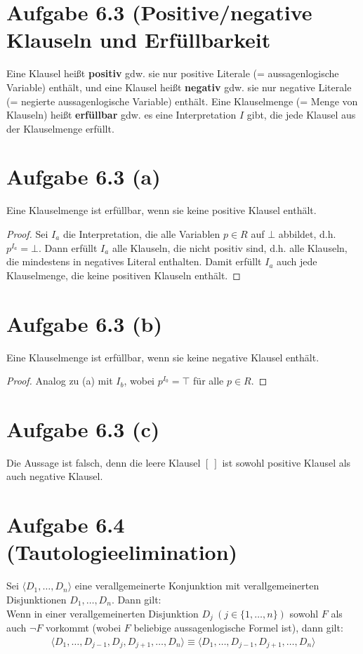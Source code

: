\documentclass[12pt,a4paper]{article}
\begin{document}
\section{Aufgabe 6.3 (Positive/negative Klauseln und Erfüllbarkeit}
Eine Klausel heißt \textbf{positiv} gdw. sie nur positive Literale (= aussagenlogische Variable) enthält, und eine Klausel heißt \textbf{negativ} gdw. sie nur negative Literale (= negierte aussagenlogische Variable) enthält.\nl
Eine Klauselmenge (= Menge von Klauseln) heißt \textbf{erfüllbar} gdw. es eine Interpretation $I$ gibt, die jede Klausel aus der Klauselmenge erfüllt.

\section*{Aufgabe 6.3 (a)}
Eine Klauselmenge ist erfüllbar, wenn sie keine positive Klausel enthält.

\begin{proof}
Sei $I_a$ die Interpretation, die alle Variablen $p\in R$ auf $\bot$ abbildet, d.h. $p^{I_a}=\bot$. Dann erfüllt $I_a$ alle Klauseln, die nicht positiv sind, d.h. alle Klauseln, die mindestens in negatives Literal enthalten. Damit erfüllt $I_a$ auch jede Klauselmenge, die keine positiven Klauseln enthält.
\end{proof}

\section*{Aufgabe 6.3 (b)}
Eine Klauselmenge ist erfüllbar, wenn sie keine negative Klausel enthält.

\begin{proof}
Analog zu (a) mit $I_b$, wobei $p^{I_0}=\top$ für alle $p\in R$.
\end{proof}

\section*{Aufgabe 6.3 (c)}
Die Aussage ist falsch, denn die leere Klausel $[~]$ ist sowohl positive Klausel als auch negative Klausel.

\section*{Aufgabe 6.4 (Tautologieelimination)}
Sei $\langle D_1,\ldots,D_n\rangle$ eine verallgemeinerte Konjunktion mit verallgemeinerten Disjunktionen $D_1,\ldots,D_n$. Dann gilt:\\
Wenn in einer verallgemeinerten Disjunktion $D_j~(j\in\lbrace1,\ldots,n\rbrace)$ sowohl $F$ als auch $\neg F$ vorkommt (wobei $F$ beliebige aussagenlogische Formel ist), dann gilt:
\begin{align*}
\big\langle D_1,\ldots,D_{j-1},D_j,D_{j+1},\ldots, D_n\big\rangle\equiv\big\langle D_1,\ldots,D_{j-1},D_{j+1},\ldots,D_n\big\rangle
\end{align*}
\end{document}
